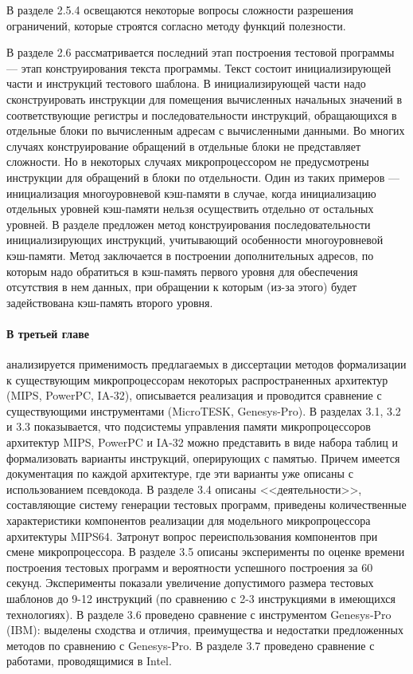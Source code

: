 \documentclass[14pt,autoref,href
,facsimile
]{disser}
\begin{document}
В разделе 2.5.4 освещаются некоторые вопросы сложности разрешения ограничений, которые строятся согласно методу функций полезности.


В разделе 2.6 рассматривается последний этап построения тестовой программы --- этап конструирования текста программы. Текст состоит инициализирующей части и инструкций тестового шаблона. В инициализирующей части надо сконструировать инструкции для помещения вычисленных начальных значений в соответствующие регистры и последовательности инструкций, обращающихся в отдельные блоки по вычисленным адресам с вычисленными данными. Во многих случаях конструирование обращений в отдельные блоки не представляет сложности. Но в некоторых случаях микропроцессором не предусмотрены инструкции для обращений в блоки по отдельности. Один из таких примеров --- инициализация многоуровневой кэш-памяти в случае, когда инициализацию отдельных уровней кэш-памяти нельзя осуществить отдельно от остальных уровней. В разделе предложен метод конструирования последовательности инициализирующих инструкций, учитывающий особенности многоуровневой кэш-памяти. Метод заключается в построении дополнительных адресов, по которым надо обратиться в кэш-память первого уровня для обеспечения отсутствия в нем данных, при обращении к которым (из-за этого) будет задействована кэш-память второго уровня.

\paragraph{В третьей главе} анализируется применимость предлагаемых в диссертации методов формализации к существующим микропроцессорам некоторых распространенных архитектур (MIPS, PowerPC, IA-32), описывается реализация и проводится сравнение с существующими инструментами (MicroTESK, Genesys-Pro). В разделах 3.1, 3.2 и 3.3 показывается, что подсистемы управления памяти микропроцессоров архитектур MIPS, PowerPC и IA-32 можно представить в виде набора таблиц и формализовать варианты инструкций, оперирующих с памятью. Причем имеется документация по каждой архитектуре, где эти варианты уже описаны с использованием псевдокода. В разделе 3.4 описаны <<деятельности>>, составляющие систему генерации тестовых программ, приведены количественные характеристики компонентов реализации для модельного микропроцессора архитектуры MIPS64. Затронут вопрос переиспользования компонентов при смене микропроцессора. В разделе 3.5 описаны эксперименты по оценке времени построения тестовых программ и вероятности успешного построения за 60 секунд. Эксперименты показали увеличение допустимого размера тестовых шаблонов до 9-12 инструкций (по сравнению с 2-3 инструкциями в имеющихся технологиях). В разделе 3.6 проведено сравнение с инструментом Genesys-Pro (IBM): выделены сходства и отличия, преимущества и недостатки предложенных методов по сравнению с Genesys-Pro. В разделе 3.7 проведено сравнение с работами, проводящимися в Intel.
\end{document}
